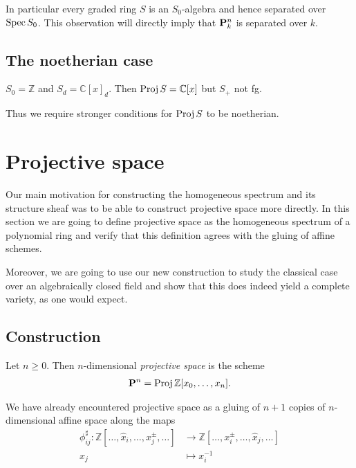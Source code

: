 \documentclass{article}
\begin{document}
In particular every graded ring $S$ is an $S_0$-algebra and hence
separated over $\operatorname{Spec} S_0$. This observation will directly imply
that $\mathbf{P}^{n}_{k}$ is separated over $k$.

\subsection{The noetherian case}

\begin{example}
  $S_0 = \mathbb{Z}$ and $S_d = \mathbb{C}[x]_d$.
  Then $\operatorname{Proj} S = \mathbb{C}[x]$ but $S_+$ not fg.
  \missingexample
\end{example}

Thus we require stronger conditions for $\operatorname{Proj} S$ to be noetherian.

\section{Projective space}

Our main motivation for constructing the homogeneous spectrum and
its structure sheaf was to be able to construct projective space
more directly. In this section we are going to define projective space
as the homogeneous spectrum of a polynomial ring and verify that
this definition agrees with the gluing of affine schemes.

Moreover, we are going to use our new construction to study the
classical case over an algebraically closed field and show that this
does indeed yield a complete variety, as one would expect.

\subsection{Construction}

\begin{definition}
  Let $n\geq 0$. Then $n$-dimensional \emph{projective space}
  is the scheme
  \begin{align*}
    \mathbf{P}^{n}_{} = \operatorname{Proj} \mathbb{Z}[x_0,\ldots,x_n].
  \end{align*}
\end{definition}

We have already encountered projective space as a gluing of $n+1$
copies of $n$-dimensional affine space along the maps
\begin{align*}
  \phi^\sharp_{ij} :
  \mathbb{Z}[\ldots,\hat x_i,\ldots,x_j^\pm,\ldots]
  &\to \mathbb{Z}[\ldots,x_i^\pm,\ldots,\hat x_j,\ldots] \\
  x_j &\mapsto {x^{-1}_i}
\end{align*}
\end{document}

